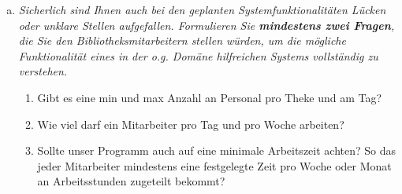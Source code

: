 \begin{enumerate} [a)]
\begin{itemize}
        \item \textbf{Funktionale Anforderungen}
        \begin{enumerate}[1.]
            \item Präferenzen und Verhinderungen sollten von Mitarbeitern angegeben werden können.
            \item Alle Mitarbeiter sollten den Plan erhalten.
            \item Es sollte Fehlerfrei einen Plan erstellen werden können.
            \begin{enumerate}[3.1]
                \item Es wird auf einsatzbereites Personal geachtet
                \item Es wird auf Präferenzen und Verhinderungen geachtet
                \item Jede Theke soll mit der richtigen Anzahl versorgt werden
            \end{enumerate}
        \end{enumerate}
    \end{itemize}
    
    
    \item {\itshape Sicherlich sind Ihnen auch bei den geplanten Systemfunktionalitäten Lücken oder unklare Stellen aufgefallen. Formulieren Sie \textbf{mindestens zwei Fragen}, die Sie den Bibliotheksmitarbeitern stellen würden, um die mögliche Funktionalität eines in der o.g. Domäne hilfreichen Systems vollständig zu verstehen.}
    \begin{enumerate}[1.]
        \item Gibt es eine min und max Anzahl an Personal pro Theke und am Tag?
        \item Wie viel darf ein Mitarbeiter pro Tag und pro Woche arbeiten?
        \item Sollte unser Programm auch auf eine minimale Arbeitszeit achten? So das jeder Mitarbeiter mindestens eine festgelegte Zeit pro Woche oder Monat an Arbeitsstunden zugeteilt bekommt? 
    \end{enumerate}
    

\end{enumerate}

